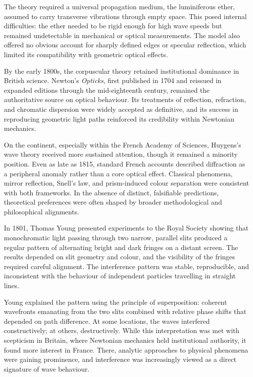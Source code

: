 The theory required a universal propagation medium, the luminiferous ether, assumed to carry transverse vibrations through empty space. This posed internal difficulties: the ether needed to be rigid enough for high wave speeds but remained undetectable in mechanical or optical measurements. The model also offered no obvious account for sharply defined edges or specular reflection, which limited its compatibility with geometric optical effects.

By the early 1800s, the corpuscular theory retained institutional dominance in British science. Newton's \textit{Opticks}, first published in 1704 and reissued in expanded editions through the mid-eighteenth century, remained the authoritative source on optical behaviour. Its treatments of reflection, refraction, and chromatic dispersion were widely accepted as definitive, and its success in reproducing geometric light paths reinforced its credibility within Newtonian mechanics.

On the continent, especially within the French Academy of Sciences, Huygens's wave theory received more sustained attention, though it remained a minority position. Even as late as 1815, standard French accounts described diffraction as a peripheral anomaly rather than a core optical effect. Classical phenomena, mirror reflection, Snell's law, and prism-induced colour separation were consistent with both frameworks. In the absence of distinct, falsifiable predictions, theoretical preferences were often shaped by broader methodological and philosophical alignments.

In 1801, Thomas Young presented experiments to the Royal Society showing that monochromatic light passing through two narrow, parallel slits produced a regular pattern of alternating bright and dark fringes on a distant screen. The results depended on slit geometry and colour, and the visibility of the fringes required careful alignment. The interference pattern was stable, reproducible, and inconsistent with the behaviour of independent particles travelling in straight lines.

Young explained the pattern using the principle of superposition: coherent wavefronts emanating from the two slits combined with relative phase shifts that depended on path difference. At some locations, the waves interfered constructively; at others, destructively. While this interpretation was met with scepticism in Britain, where Newtonian mechanics held institutional authority, it found more interest in France. There, analytic approaches to physical phenomena were gaining prominence, and interference was increasingly viewed as a direct signature of wave behaviour.


